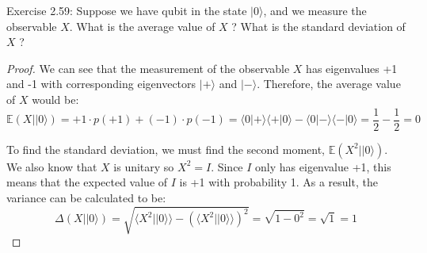 \begin{problem}
	Exercise 2.59: Suppose we have qubit in the state $|0\rangle$, and we measure the observable $X$. What is the average value of $X$ ? What is the standard deviation of $X$ ?
\end{problem}
\begin{proof}
	We can see that the measurement of the observable \(X\) has eigenvalues +1 and -1 with corresponding eigenvectors \(|+\rangle\) and \(|-\rangle\). Therefore, the average value of \(X\) would be:
\[ \mathbb{E}(X | |0\rangle) = +1 \cdot p(+1) + (-1) \cdot p(-1) = \langle0|+\rangle \langle+|0\rangle - \langle0|-\rangle \langle-|0\rangle = \frac{1}{2} - \frac{1}{2} = 0 \]

To find the standard deviation, we must find the second moment, \(\mathbb{E}(X^2||0\rangle)\). We also know that \(X\) is unitary so \(X^2 = I\). Since \(I\) only has eigenvalue +1, this means that the expected value of \(I\) is +1 with probability 1. As a result, the variance can be calculated to be:
\[ \Delta(X||0\rangle) = \sqrt{\langle X^2||0\rangle\rangle - \left(\langle X^2||0\rangle\rangle\right)^2} = \sqrt{1 - 0^2} = \sqrt{1} = 1 \]
\end{proof}

